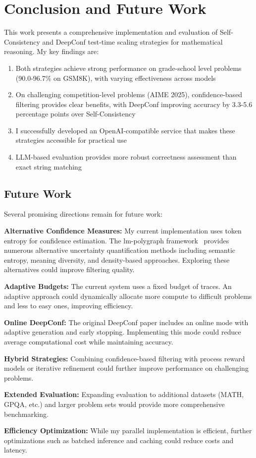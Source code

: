 \documentclass[11pt]{article}
\begin{document}
\section{Conclusion and Future Work}

This work presents a comprehensive implementation and evaluation of Self-Consistency and DeepConf test-time scaling strategies for mathematical reasoning. My key findings are:

\begin{enumerate}
    \item Both strategies achieve strong performance on grade-school level problems (90.0-96.7\% on GSM8K), with varying effectiveness across models
    \item On challenging competition-level problems (AIME 2025), confidence-based filtering provides clear benefits, with DeepConf improving accuracy by 3.3-5.6 percentage points over Self-Consistency
    \item I successfully developed an OpenAI-compatible service that makes these strategies accessible for practical use
    \item LLM-based evaluation provides more robust correctness assessment than exact string matching
\end{enumerate}

\subsection{Future Work}

Several promising directions remain for future work:

\textbf{Alternative Confidence Measures:} My current implementation uses token entropy for confidence estimation. The lm-polygraph framework~\cite{shelmanov2024benchmarking} provides numerous alternative uncertainty quantification methods including semantic entropy, meaning diversity, and density-based approaches. Exploring these alternatives could improve filtering quality.

\textbf{Adaptive Budgets:} The current system uses a fixed budget of traces. An adaptive approach could dynamically allocate more compute to difficult problems and less to easy ones, improving efficiency.

\textbf{Online DeepConf:} The original DeepConf paper includes an online mode with adaptive generation and early stopping. Implementing this mode could reduce average computational cost while maintaining accuracy.

\textbf{Hybrid Strategies:} Combining confidence-based filtering with process reward models or iterative refinement could further improve performance on challenging problems.

\textbf{Extended Evaluation:} Expanding evaluation to additional datasets (MATH, GPQA, etc.) and larger problem sets would provide more comprehensive benchmarking.

\textbf{Efficiency Optimization:} While my parallel implementation is efficient, further optimizations such as batched inference and caching could reduce costs and latency.


\end{document}
